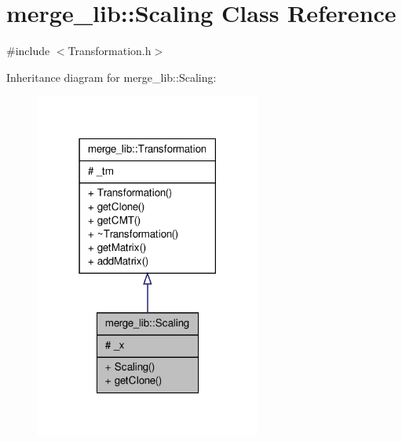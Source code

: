 \hypertarget{classmerge__lib_1_1_scaling}{\section{merge\-\_\-lib\-:\-:Scaling Class Reference}
\label{d0/d83/classmerge__lib_1_1_scaling}
}


{\ttfamily \#include $<$Transformation.\-h$>$}



Inheritance diagram for merge\-\_\-lib\-:\-:Scaling\-:
\nopagebreak
\begin{figure}[H]
\begin{center}
\leavevmode
\includegraphics[width=210pt]{d2/d52/classmerge__lib_1_1_scaling__inherit__graph}
\end{center}
\end{figure}


